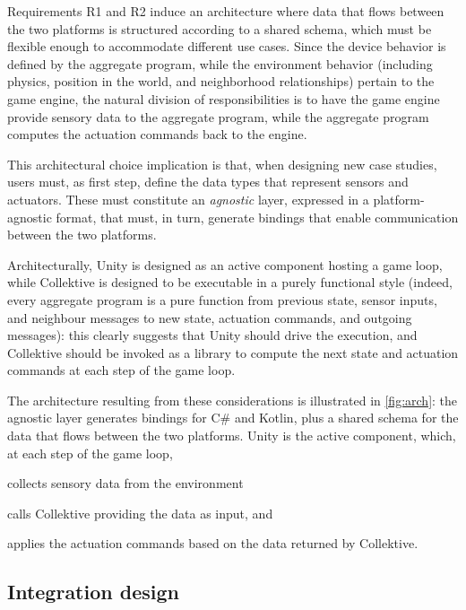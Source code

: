 \documentclass[runningheads]{llncs}
\newenvironment{inlinelist}{\begin{enumerate*}[label=\emph{(\roman*)}]}{\end{enumerate*}}
\begin{document}
Requirements R1 and R2 induce an architecture where data that flows between the two platforms
is structured according to a shared schema, which must be flexible enough to accommodate different use cases.
%
Since the device behavior is defined by the aggregate program,
while the environment behavior
(including physics, position in the world, and neighborhood relationships)
pertain to the game engine,
the natural division of responsibilities is to have the game engine provide sensory data to the aggregate program,
while the aggregate program computes the actuation commands back to the engine.

This architectural choice implication is that, when designing new case studies,
users must, as first step,
define the data types that represent sensors and actuators.
%
These must constitute an \emph{agnostic} layer,
expressed in a platform-agnostic format,
that must, in turn, generate bindings that enable communication between the two platforms.

Architecturally,
Unity is designed as an active component hosting a game loop,
while Collektive is designed to be executable in a purely functional style
(indeed, every aggregate program is a pure function from previous state, sensor inputs,
and neighbour messages to new state, actuation commands, and outgoing messages):
this clearly suggests that Unity should drive the execution,
and Collektive should be invoked as a library to compute the next state and actuation commands at each step of the game loop.

The architecture resulting from these considerations is illustrated in \cref{fig:arch}:
the agnostic layer generates bindings for C\# and Kotlin,
plus a shared schema for the data that flows between the two platforms.
%
Unity is the active component,
which, at each step of the game loop,
\begin{inlinelist}
    \item collects sensory data from the environment
    \item calls Collektive providing the data as input, and
    \item applies the actuation commands based on the data returned by Collektive.
\end{inlinelist}

\subsection{Integration design}\label{subsec:integration-design}
\end{document}
